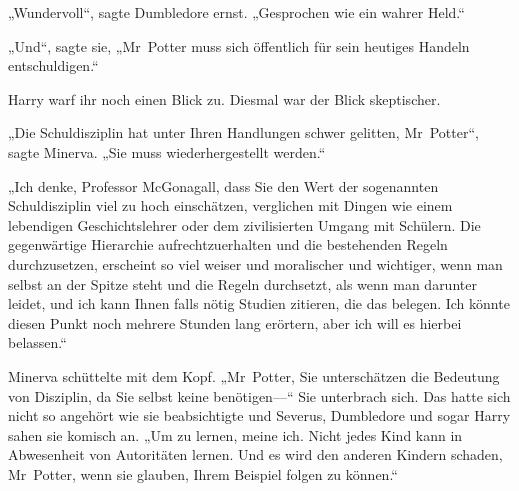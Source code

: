 „Wundervoll“, sagte Dumbledore ernst. „Gesprochen wie ein wahrer Held.“

„Und“, sagte sie, „Mr~Potter muss sich öffentlich für sein heutiges Handeln entschuldigen.“

Harry warf ihr noch einen Blick zu. Diesmal war der Blick skeptischer.

„Die Schuldisziplin hat unter Ihren Handlungen schwer gelitten, Mr~Potter“, sagte Minerva. „Sie muss wiederhergestellt werden.“

„Ich denke, Professor McGonagall, dass Sie den Wert der sogenannten Schuldisziplin viel zu hoch einschätzen, verglichen mit Dingen wie einem lebendigen Geschichtslehrer oder dem zivilisierten Umgang mit Schülern. Die gegenwärtige Hierarchie aufrechtzuerhalten und die bestehenden Regeln durchzusetzen, erscheint so viel weiser und moralischer und wichtiger, wenn man selbst an der Spitze steht und die Regeln durchsetzt, als wenn man darunter leidet, und ich kann Ihnen falls nötig Studien zitieren, die das belegen. Ich könnte diesen Punkt noch mehrere Stunden lang erörtern, aber ich will es hierbei belassen.“

Minerva schüttelte mit dem Kopf. „Mr~Potter, Sie unterschätzen die Bedeutung von Disziplin, da Sie selbst keine benötigen—“ Sie unterbrach sich. Das hatte sich nicht so angehört wie sie beabsichtigte und Severus, Dumbledore und sogar Harry sahen sie komisch an. „Um zu lernen, meine ich. Nicht jedes Kind kann in Abwesenheit von Autoritäten lernen. Und es wird den anderen Kindern schaden, Mr~Potter, wenn sie glauben, Ihrem Beispiel folgen zu können.“

